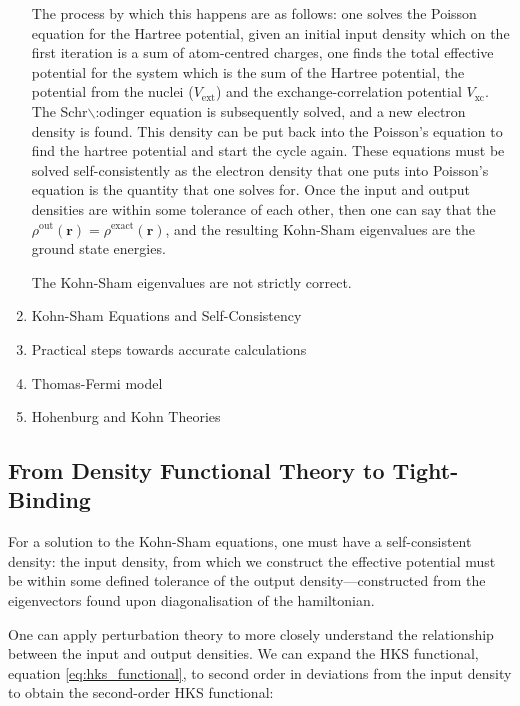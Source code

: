 \documentclass[a4paper,12pt,oneside,print,numbered,index,PageStyleIII]{PhDThesisPSnPDF}
\begin{document}
\begin{enumerate}
The process by which this happens are as follows: one solves the Poisson
equation for the Hartree potential, given an initial input density which on
the first iteration is a sum of atom-centred charges, one finds the total
effective potential for the system which is the sum of the Hartree potential,
the potential from the nuclei (\(V_{\text{ext}}\)) and the exchange-correlation
potential \(V_{\text{xc}}\). The Schr$\backslash$:odinger equation is subsequently solved,
and a new electron density is found. This density can be put back into the
Poisson's equation to find the hartree potential and start the cycle
again. These equations must be solved self-consistently as the electron
density that one puts into Poisson's equation is the quantity that one solves
for. Once the input and output densities are within some tolerance of each
other, then one can say that the \(\rho^{\text{out}}(\mathbf{r}) =
 \rho^{\text{exact}}(\mathbf{r})\), and the resulting Kohn-Sham eigenvalues are
the ground state energies.

The Kohn-Sham eigenvalues are not strictly correct.


\item Kohn-Sham Equations and Self-Consistency
\label{sec:org098bb98}


\item Practical steps towards accurate calculations
\label{sec:org27f20f5}



\item Thomas-Fermi model
\label{sec:org5efbecd}

\item Hohenburg and Kohn Theories
\label{sec:org5336b6a}
\end{enumerate}




\subsection{From Density Functional Theory to Tight-Binding}
\label{sec:orgd9636fb}

For a solution to the Kohn-Sham equations, one must have a self-consistent
density: the input density, from which we construct the effective potential
must be within some defined tolerance of the output density---constructed
from the eigenvectors found upon diagonalisation of the hamiltonian.

One can apply perturbation theory to more closely understand the relationship
between the input and output densities. We can expand the HKS functional,
equation \eqref{eq:hks_functional}, to second order in deviations from the
input density to obtain the second-order HKS functional:
\end{document}
